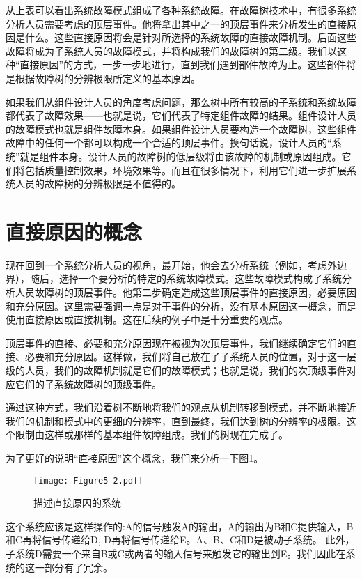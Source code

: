 \documentclass[cn,11pt,chinese]{elegantbook}
\begin{document}
从上表可以看出系统故障模式组成了各种系统故障。在故障树技术中，有很多系统分析人员需要考虑的顶层事件。他将拿出其中之一的顶层事件来分析发生的直接原因是什么。这些直接原因将会是针对所选择的系统故障的直接故障机制。后面这些故障将成为子系统人员的故障模式，并将构成我们的故障树的第二级。我们以这种“直接原因”的方式，一步一步地进行，直到我们遇到部件故障为止。这些部件将是根据故障树的分辨极限所定义的基本原因。

如果我们从组件设计人员的角度考虑问题，那么树中所有较高的子系统和系统故障都代表了故障效果——也就是说，它们代表了特定组件故障的结果。组件设计人员的故障模式也就是组件故障本身。如果组件设计人员要构造一个故障树，这些组件故障中的任何一个都可以构成一个合适的顶层事件。换句话说，设计人员的“系统”就是组件本身。设计人员的故障树的低层级将由该故障的机制或原因组成。它们将包括质量控制效果，环境效果等。而且在很多情况下，利用它们进一步扩展系统人员的故障树的分辨极限是不值得的。


\section{直接原因的概念}

现在回到一个系统分析人员的视角，最开始，他会去分析系统（例如，考虑外边界），随后，选择一个要分析的特定的系统故障模式。这些故障模式构成了系统分析人员故障树的顶层事件。他第二步确定造成这些顶层事件的直接原因，必要原因和充分原因。这里需要强调一点是对于事件的分析，没有基本原因这一概念，而是使用直接原因或直接机制。这在后续的例子中是十分重要的观点。

顶层事件的直接、必要和充分原因现在被视为次顶层事件，我们继续确定它们的直接、必要和充分原因。这样做，我们将自己放在了子系统人员的位置，对于这一层级的人员，我们的故障机制就是它们的故障模式；也就是说，我们的次顶级事件对应它们的子系统故障树的顶级事件。

通过这种方式，我们沿着树不断地将我们的观点从机制转移到模式，并不断地接近我们的机制和模式中的更细的分辨率，直到最终，我们达到树的分辨率的极限。这个限制由这样或那样的基本组件故障组成。我们的树现在完成了。

为了更好的说明“直接原因”这个概念，我们来分析一下图\ref{fig:fig5-2}。

\begin{figure}[h]
	\centering
	\texttt{[image: Figure5-2.pdf]}
	\caption{描述直接原因的系统}\label{fig:fig5-2}
\end{figure}

这个系统应该是这样操作的:A的信号触发A的输出，A的输出为B和C提供输入，B和C再将信号传递给D, D再将信号传递给E。A、B、C和D是被动子系统。
此外，子系统D需要一个来自B或C或两者的输入信号来触发它的输出到E。我们因此在系统的这一部分有了冗余。
\end{document}
